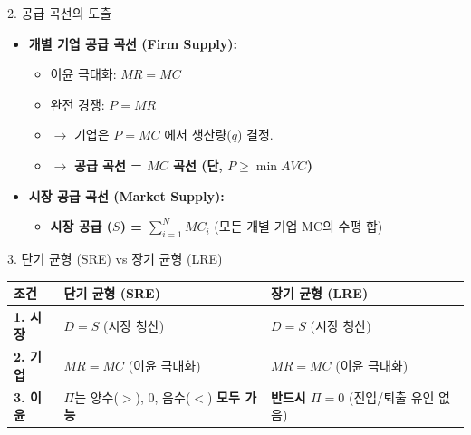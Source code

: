\documentclass[11pt,a4paper]{article}
\theoremstyle{definition}
\begin{document}
\begin{mybox}{2. 공급 곡선의 도출}
\begin{itemize}
    \item \textbf{개별 기업 공급 곡선 (Firm Supply):}
    \begin{itemize}
        \item 이윤 극대화: $MR = MC$
        \item 완전 경쟁: $P = MR$
        \item $\to$ 기업은 $P = MC$ 에서 생산량($q$) 결정.
        \item $\to$ \textbf{공급 곡선 = $MC$ 곡선 (단, $P \ge \min AVC$)}
    \end{itemize}
    \item \textbf{시장 공급 곡선 (Market Supply):}
    \begin{itemize}
        \item \textbf{시장 공급 ($S$) = $\sum_{i=1}^{N} MC_i$} (모든 개별 기업 MC의 수평 합)
    \end{itemize}
\end{itemize}
\end{mybox}

\begin{summarybox}{3. 단기 균형 (SRE) vs 장기 균형 (LRE)}
\begin{tabularx}{\textwidth}{@{}l|X|X@{}}
\toprule
\textbf{조건} & \textbf{단기 균형 (SRE)} & \textbf{장기 균형 (LRE)} \\
\midrule
\textbf{1. 시장} & $D = S$ (시장 청산) & $D = S$ (시장 청산) \\
\midrule
\textbf{2. 기업} & $MR = MC$ (이윤 극대화) & $MR = MC$ (이윤 극대화) \\
\midrule
\textbf{3. 이윤} & $\Pi$는 양수($>$), 0, 음수($<$) \textbf{모두 가능} & \textbf{반드시 $\Pi = 0$} (진입/퇴출 유인 없음) \\
\bottomrule
\end{tabularx}
\end{summarybox}
\end{document}
